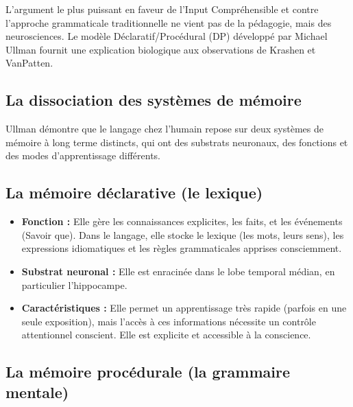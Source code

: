 L'argument le plus puissant en faveur de l'Input Compréhensible et contre l'approche grammaticale
traditionnelle ne vient pas de la pédagogie, mais des neurosciences. Le modèle Déclaratif/Procédural
(DP) développé par Michael Ullman fournit une explication biologique aux observations de Krashen et
VanPatten.



\subsection{La dissociation des systèmes de mémoire}

Ullman démontre que le langage chez l'humain repose sur deux systèmes de mémoire à long terme
distincts, qui ont des substrats neuronaux, des fonctions et des modes d'apprentissage
différents.\cite{II-3-3-ref17}



\subsection{La mémoire déclarative (le lexique)}

\begin{itemize}\item \textbf{Fonction :} Elle gère les connaissances explicites, les faits, et les événements (\og Savoir que\fg{}). Dans le langage, elle stocke le lexique (les mots, leurs sens), les expressions idiomatiques et les règles grammaticales apprises consciemment.\item \textbf{Substrat neuronal :} Elle est enracinée dans le lobe temporal médian, en particulier l'hippocampe.\cite{II-3-3-ref18}\item \textbf{Caractéristiques :} Elle permet un apprentissage très rapide (parfois en une seule exposition), mais l'accès à ces informations nécessite un contrôle attentionnel conscient. Elle est explicite et accessible à la conscience.\end{itemize}

\subsection{La mémoire procédurale (la grammaire mentale)}

